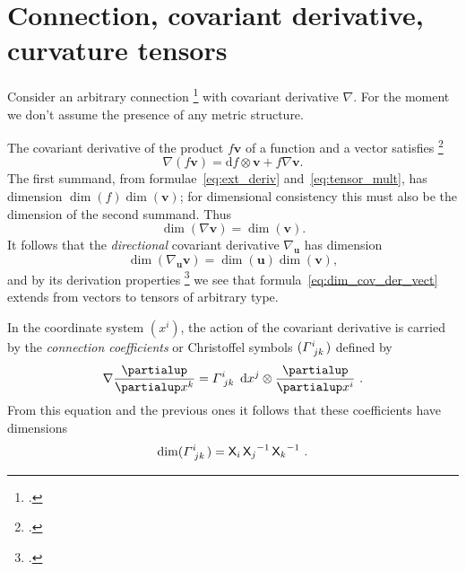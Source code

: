 \documentclass[\ifafour a4paper,12pt,\else a5paper,10pt,\fi%
onecolumn,oneside,article,%
british%
]{memoir}
\theoremstyle{remark}
\theoremstyle{innote}
\newcommand*{\citep}{\footcites}
\newcommand*{\de}{\partialup}%
\newcommand*{\di}{\mathrm{d}}%
\renewcommand*{\|}[1][]{\nonscript\,#1\vert\nonscript\;\mathopen{}}
\newcommand*{\sect}{\S}%
\newcommand*{\Xx}{\textsf{X}}
\newcommand*{\yv}{\bm{v}}
\newcommand*{\yu}{\bm{u}}
\renewcommand*{\i}{\indices}
\newcommand*{\dex}[1][i]{\frac{\de}{\de x^{#1}}}
\newcommand*{\dix}[1][i]{\di x^{#1}}
\newcommand*{\nab}{\nabla}
\newcommand*{\yGa}{\varGamma}
\begin{document}
\section{Connection, covariant derivative, curvature tensors}
\label{sec:connection}

Consider an arbitrary connection
\citep[\sect~V.B]{choquetbruhatetal1977_r1996} with covariant derivative
$\nab$. For the moment we don't assume the presence of any metric
structure.

The covariant derivative of the product $f\yv$ of a function and a vector
satisfies \citep[\sect~V.B.1]{choquetbruhatetal1977_r1996}
\begin{equation}
  \label{eq:basic_property_covder}
  \nab(f\yv) = \di f \otimes \yv + f\nab\yv.
\end{equation}
The first summand, from formulae~\eqref{eq:ext_deriv}
and~\eqref{eq:tensor_mult}, has dimension $\dim(f)\dim(\yv)$; for
dimensional consistency this must also be the dimension of the second
summand. Thus
\begin{equation}
  \label{eq:dim_cov_der_vect}
  \dim(\nab\yv) = \dim(\yv).
\end{equation}
It follows that the \emph{directional} covariant derivative $\nab_{\yu}$
has dimension
\begin{equation}
  \label{eq:dim_dircov_der_vect}
  \dim(\nab_{\yu}\yv) = \dim(\yu)\dim(\yv),
\end{equation}
and by its derivation properties \citep[\sect~V.B.1
p.~303]{choquetbruhatetal1977_r1996} we see that
formula~\eqref{eq:dim_cov_der_vect} extends from vectors to 
tensors of arbitrary type.

\medskip

In the coordinate system $(x^{i})$, the action of the covariant derivative
is carried by the \emph{connection coefficients} or Christoffel symbols
$(\yGa\i{^{i}_{jk}})$ defined by
\begin{equation}
  \label{eq:christoffel}
  \nab\dex[k] = \yGa\i{^{i}_{jk}}\  \dix[j]\otimes\dex[i]\ .
\end{equation}
From this equation and the previous ones it follows that these coefficients
have dimensions
\begin{equation}
  \label{eq:dim_christoffel}
  \dim(\yGa\i{^{i}_{jk}}) = \Xx_{i}\, {\Xx_{j}}^{-1}\,{\Xx_{k}}^{-1}\ .
\end{equation}

\medskip
\end{document}
